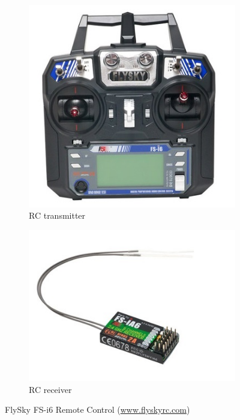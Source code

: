 \begin{figure}[htbp]
	\centering
	\begin{subfigure}[b]{0.25\textwidth}
		\includegraphics[width=\textwidth]{./figures/RCtransmitter.jpg}
		\caption{RC transmitter}
		\label{fig:RCtransmitter}
	\end{subfigure}
	\hspace{5mm}
	\begin{subfigure}[b]{0.3\textwidth}
		\includegraphics[width=\textwidth]{./figures/RCreceiver.jpg}
		\caption{RC receiver}
		\label{fig:RCreceiver}
	\end{subfigure}
	\caption{FlySky FS-i6 Remote Control (\footnotesize{\url{www.flyskyrc.com}})}
	\label{fig:rc}
\end{figure}

